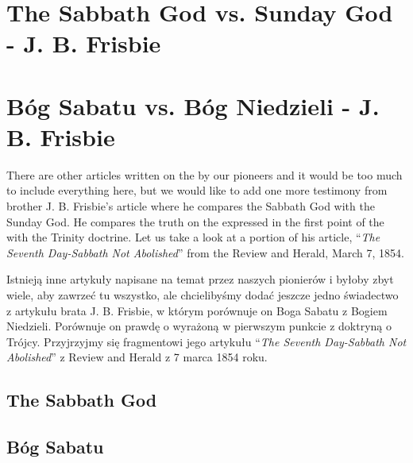\chapter{The Sabbath God vs. Sunday God - J. B. Frisbie}


\chapter{Bóg Sabatu vs. Bóg Niedzieli - J. B. Frisbie}


There are other articles written on the  by our pioneers and it would be too much to include everything here, but we would like to add one more testimony from brother J. B. Frisbie’s article where he compares the Sabbath God with the Sunday God. He compares the truth on the  expressed in the first point of the  with the Trinity doctrine. Let us take a look at a portion of his article, “\textit{The Seventh Day-Sabbath Not Abolished}” from the Review and Herald, March 7, 1854.


Istnieją inne artykuły napisane na temat  przez naszych pionierów i byłoby zbyt wiele, aby zawrzeć tu wszystko, ale chcielibyśmy dodać jeszcze jedno świadectwo z artykułu brata J. B. Frisbie, w którym porównuje on Boga Sabatu z Bogiem Niedzieli. Porównuje on prawdę o  wyrażoną w pierwszym punkcie  z doktryną o Trójcy. Przyjrzyjmy się fragmentowi jego artykułu “\textit{The Seventh Day-Sabbath Not Abolished}” z Review and Herald z 7 marca 1854 roku.


\section*{The Sabbath God}


\section*{Bóg Sabatu}




